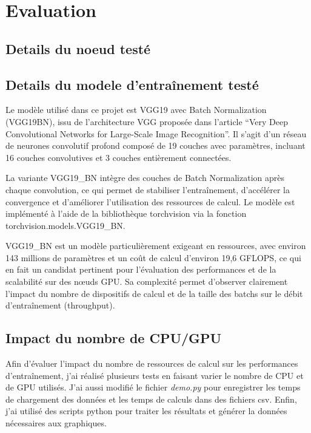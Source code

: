 \documentclass{rapportClass} %
\begin{document}


\chapter{Evaluation}
\section{Details du noeud testé} %
% 

\section{Details du modele d'entraînement testé}
Le modèle utilisé dans ce projet est VGG19 avec Batch Normalization (VGG19BN),
issu de l’architecture VGG proposée dans l’article “Very Deep Convolutional Networks for Large-Scale Image Recognition”. 
Il s’agit d’un réseau de neurones convolutif profond composé de 19 couches avec paramètres, 
incluant 16 couches convolutives et 3 couches entièrement connectées.

La variante VGG19\_BN intègre des couches de Batch Normalization après chaque convolution, ce qui permet de stabiliser l’entraînement, 
d’accélérer la convergence et d’améliorer l’utilisation des ressources de calcul. Le modèle est implémenté à l’aide 
de la bibliothèque torchvision via la fonction torchvision.models.VGG19\_BN.

VGG19\_BN est un modèle particulièrement exigeant en ressources, avec environ 143 millions de paramètres et un coût de calcul 
d’environ 19,6 GFLOPS, ce qui en fait un candidat pertinent pour l’évaluation des performances et de la scalabilité sur des nœuds GPU. 
Sa complexité permet d’observer clairement l’impact du nombre de dispositifs de calcul et de la taille des batchs sur le débit d’entraînement 
(throughput).


\section{Impact du nombre de CPU/GPU}
Afin d'évaluer l'impact du nombre de ressources de calcul sur les performances d'entraînement, 
j'ai réalisé plusieurs tests en faisant varier le nombre de CPU et de GPU utilisés.
J'ai aussi modifié le fichier \textit{demo.py} pour enregistrer les temps de chargement des données et les temps de calculs dans des fichiers csv.
Enfin, j'ai utilisé des scripts python pour traiter les résultats et générer la données nécessaires aux graphiques.
% 
\end{document}
